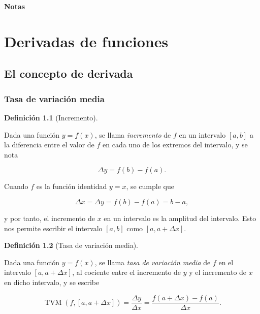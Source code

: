 \documentclass[
  a4paper,
]{scrreport}
\theoremstyle{plain}
\theoremstyle{plain}
\theoremstyle{definition}
\newtheorem{definition}{Definición}[chapter]
\theoremstyle{definition}
\theoremstyle{plain}
\theoremstyle{remark}
\begin{document}
\textbf{Notas}


\hypertarget{derivadas-de-funciones}{%
\chapter{Derivadas de funciones}\label{derivadas-de-funciones}}

\hypertarget{el-concepto-de-derivada}{%
\section{El concepto de derivada}\label{el-concepto-de-derivada}}

\hypertarget{tasa-de-variaciuxf3n-media}{%
\subsection{Tasa de variación media}\label{tasa-de-variaciuxf3n-media}}

\leavevmode{}%
\begin{definition}[Incremento]\label{def-incremento}

Dada una función \(y=f(x)\), se llama \emph{incremento} de \(f\) en un
intervalo \([a,b]\) a la diferencia entre el valor de \(f\) en cada uno
de los extremos del intervalo, y se nota

\[\Delta y= f(b)-f(a).\]

\end{definition}

Cuando \(f\) es la función identidad \(y=x\), se cumple que

\[\Delta x=\Delta y= f(b)-f(a)=b-a,\]

y por tanto, el incremento de \(x\) en un intervalo es la amplitud del
intervalo. Esto nos permite escribir el intervalo \([a,b]\) como
\([a,a+\Delta x]\).

\leavevmode{}%
\begin{definition}[Tasa de variación
media]\label{def-tasa-variacion-media}

Dada una función \(y=f(x)\), se llama \emph{tasa de variación media} de
\(f\) en el intervalo \([a,a+\Delta x]\), al cociente entre el
incremento de \(y\) y el incremento de \(x\) en dicho intervalo, y se
escribe

\[
\operatorname{TVM}(f,[a,a+\Delta x])=\frac{\Delta y}{\Delta x}=\frac{f(a+\Delta x)-f(a)}{\Delta x}.
\]

\end{definition}
\end{document}
